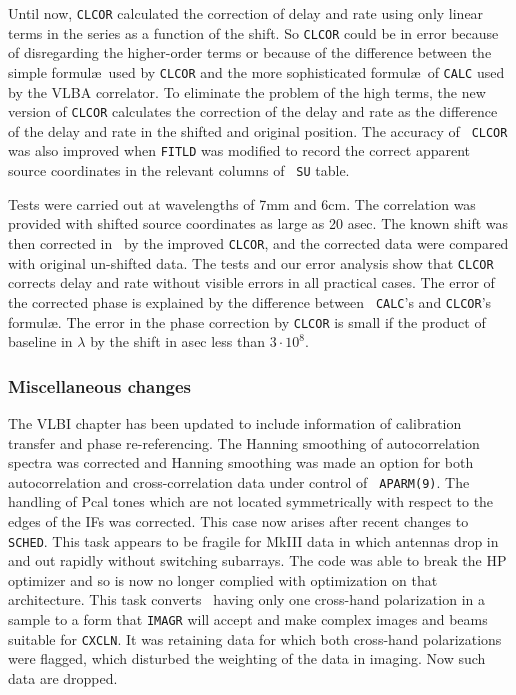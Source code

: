 Until now, {\tt CLCOR} calculated the correction of delay and rate
using only linear terms in the series as a function of the shift. So
{\tt CLCOR} could be in error because of disregarding the
higher-order terms or because of the difference between the simple
formul\ae\ used by {\tt CLCOR} and the more sophisticated formul\ae\
of {\tt CALC} used by the VLBA correlator.  To eliminate the problem
of the high terms, the new version of {\tt CLCOR} calculates the
correction of the delay and rate as the difference of the delay and
rate in the shifted and original position.  The accuracy of {\tt
CLCOR} was also improved when {\tt FITLD} was modified to record the
correct apparent source coordinates in the relevant columns of {\tt
SU} table.

Tests were carried out at wavelengths of 7mm and 6cm.  The correlation
was provided with shifted source coordinates as large as 20 asec. The
known shift was then corrected in \AIPS\ by the improved {\tt CLCOR},
and the corrected data were compared with original un-shifted data.
The tests and our error analysis show that {\tt CLCOR} corrects delay
and rate without visible errors in all practical cases.  The error of
the corrected phase is explained by the difference between {\tt
CALC}'s and {\tt CLCOR}'s formul\ae.  The error in the phase
correction by {\tt CLCOR} is small if the product of baseline in
$\lambda$ by the shift in asec less than $3 \cdot 10^8$.

\subsubsection{Miscellaneous changes}

\begin{description}
\myitem{\Cookbook} The VLBI chapter has been updated to include
    information of calibration transfer and phase re-referencing.
\myitem{CVEL} The Hanning smoothing of autocorrelation spectra was
    corrected and Hanning smoothing was made an option for both
    autocorrelation and cross-correlation data under control of {\tt
    APARM(9)}\@.
 The handling of Pcal tones which are not located
    symmetrically with respect to the edges of the IFs was corrected.
    This case now arises after recent changes to {\tt SCHED}\@.
 This task appears to be fragile for MkIII data in which
    antennas drop in and out rapidly without switching subarrays.  The
    code was able to break the HP optimizer and so is now no longer
    complied with optimization on that architecture.
 This task converts \uvdata\ having only one cross-hand
    polarization in a sample to a form that {\tt IMAGR} will accept
    and make complex images and beams suitable for {\tt CXCLN}\@.  It
    was retaining data for which both cross-hand polarizations were
    flagged, which disturbed the weighting of the data in imaging.
    Now such data are dropped.
\end{description}


